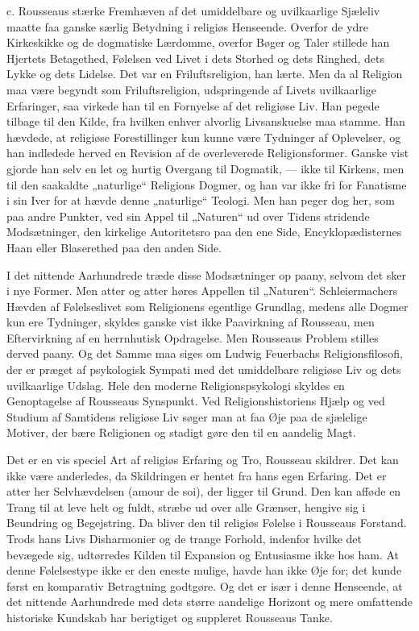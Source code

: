 \documentclass[12pt,a4paper,openany]{book}
\newcommand{\opage}[1]{\marginnote{\footnotesize\textit{[#1]}}}
\begin{document}
c. Rousseaus stærke Fremhæven af det umiddelbare og
uvilkaarlige Sjæleliv maatte faa ganske særlig Betydning i religiøs
Henseende. Overfor de ydre Kirkeskikke og de dogmatiske
Lærdomme, overfor Bøger og Taler stillede han Hjertets
Betagethed, Følelsen ved Livet i dets Storhed og dets Ringhed,
dets Lykke og dets Lidelse. Det var en Friluftsreligion, han
lærte. Men da al Religion maa være begyndt som Friluftsreligion,
udspringende af Livets uvilkaarlige Erfaringer, saa
virkede han til en Fornyelse af det religiøse Liv. Han pegede
tilbage til den Kilde, fra hvilken enhver alvorlig Livsanskuelse
maa stamme. Han hævdede, at religiøse Forestillinger kun
kunne være Tydninger af Oplevelser, og han indledede herved
en Revision af de overleverede Religionsformer. Ganske vist
gjorde han selv en let og hurtig Overgang til Dogmatik,
--- ikke til Kirkens, men til den saakaldte „naturlige“ Religions
Dogmer, og han var ikke fri for Fanatisme i sin Iver for at
hævde denne „naturlige“ Teologi. Men han peger dog her,
som paa andre Punkter, ved sin Appel til „Naturen“ ud over
Tidens stridende Modsætninger, den kirkelige Autoritetsro paa
den ene Side, Encyklopædisternes Haan eller Blaserethed paa
den anden Side.

I det nittende Aarhundrede træde disse Modsætninger op
paany, selvom det sker i nye Former. Men atter og atter
høres Appellen til „Naturen“. Schleiermachers Hævden af
Følelseslivet som Religionens egentlige Grundlag, medens alle
Dogmer kun ere Tydninger, skyldes ganske vist ikke Paavirkning
af Rousseau, men Eftervirkning af en herrnhutisk Opdragelse.
Men Rousseaus Problem stilles derved paany. Og det
Samme maa siges om Ludwig Feuerbachs Religionsfilosofi, der
er præget af psykologisk Sympati med det umiddelbare religiøse
Liv og dets uvilkaarlige Udslag. Hele den moderne Religionspsykologi
skyldes en Genoptagelse af Rousseaus Synspunkt.
Ved Religionshistoriens Hjælp og ved Studium af
Samtidens religiøse Liv søger man at faa Øje paa de sjælelige
\setcounter{footnote}{0}%
\opage{134}Motiver, der bære Religionen og stadigt gøre den til en aandelig
Magt.

Det er en vis speciel Art af religiøs Erfaring og Tro,
Rousseau skildrer. Det kan ikke være anderledes, da Skildringen
er hentet fra hans egen Erfaring. Det er atter her
Selvhævdelsen (amour de soi), der ligger til Grund. Den kan
afføde en Trang til at leve helt og fuldt, stræbe ud over alle
Grænser, hengive sig i Beundring og Begejstring. Da bliver
den til religiøs Følelse i Rousseaus Forstand. Trods hans Livs
Disharmonier og de trange Forhold, indenfor hvilke det bevægede
sig, udtørredes Kilden til Expansion og Entusiasme ikke
hos ham. At denne Følelsestype ikke er den eneste mulige,
havde han ikke Øje for; det kunde først en komparativ Betragtning
godtgøre. Og det er især i denne Henseende, at det
nittende Aarhundrede med dets større aandelige Horizont og
mere omfattende historiske Kundskab har berigtiget og suppleret
Rousseaus Tanke.
\end{document}
